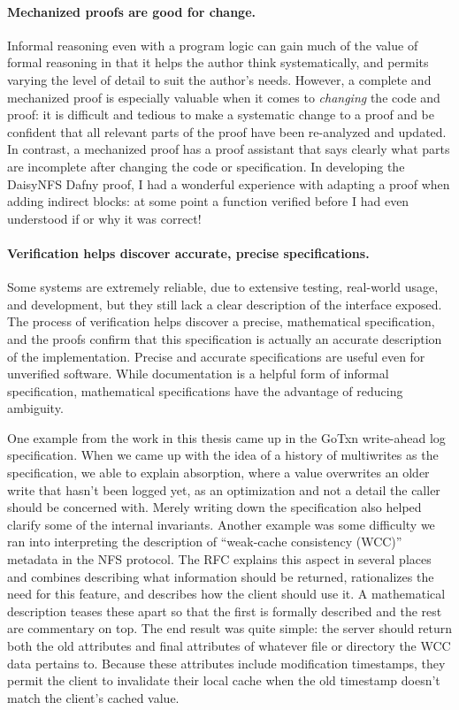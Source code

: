 \paragraph{Mechanized proofs are good for change.} Informal
reasoning even with a program logic can gain much of the value of formal
reasoning in that it helps the author think systematically, and permits varying
the level of detail to suit the author's needs. However, a complete and
mechanized proof is especially valuable when it comes to \emph{changing} the
code and proof: it is difficult and tedious to make a systematic change to a
proof and be confident that all relevant parts of the proof have been
re-analyzed and updated. In contrast, a mechanized proof has a proof assistant
that says clearly what parts are incomplete after changing the code or
specification. In developing the DaisyNFS Dafny proof, I had a wonderful
experience with adapting a proof when adding indirect blocks: at some point a
function verified before I had even understood if or why it was correct!

\paragraph{Verification helps discover accurate, precise specifications.} Some
systems are extremely reliable, due to extensive testing, real-world usage, and
development, but they still lack a clear description of the interface exposed.
The process of verification helps discover a precise, mathematical
specification, and the proofs confirm that this specification is actually an
accurate description of the implementation. Precise and accurate specifications
are useful even for unverified software. While documentation is a helpful form
of informal specification, mathematical specifications have the advantage of
reducing ambiguity.

One example from the work in this thesis came up in the GoTxn write-ahead log
specification. When we came up with the idea of a history of multiwrites as the
specification, we able to explain absorption, where a value overwrites an older
write that hasn't been logged yet, as an optimization and not a detail the
caller should be concerned with. Merely writing down the specification also
helped clarify some of the internal invariants. Another example was some
difficulty we ran into interpreting the description of ``weak-cache consistency
(WCC)'' metadata in the NFS protocol. The RFC explains this aspect in several
places and combines describing what information should be returned, rationalizes
the need for this feature, and describes how the client should use it. A
mathematical description teases these apart so that the first is formally
described and the rest are commentary on top. The end result was quite simple:
the server should return both the old attributes and final attributes of
whatever file or directory the WCC data pertains to. Because these attributes
include modification timestamps, they permit the client to invalidate their
local cache when the old timestamp doesn't match the client's cached value.


